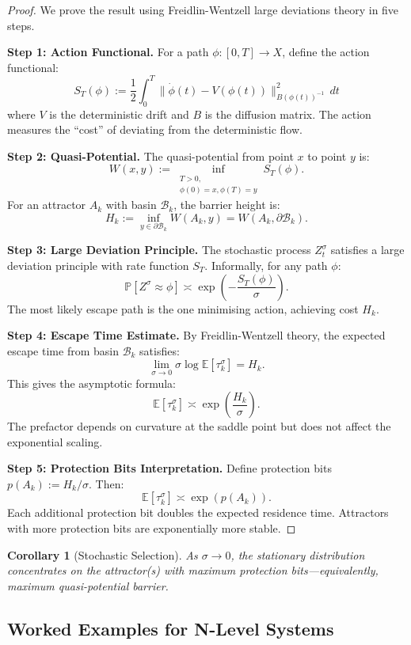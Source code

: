 \documentclass[12pt]{article}
\newtheorem{corollary}[theorem]{Corollary}
\newcommand{\E}{\mathbb{E}}
\begin{document}
\begin{proof}
We prove the result using Freidlin-Wentzell large deviations theory in five steps.

\textbf{Step 1: Action Functional.}
For a path $\phi: [0, T] \to X$, define the action functional:
\[
S_T(\phi) := \frac{1}{2} \int_0^T \|\dot{\phi}(t) - V(\phi(t))\|_{B(\phi(t))^{-1}}^2 \, dt
\]
where $V$ is the deterministic drift and $B$ is the diffusion matrix. The action measures the ``cost'' of deviating from the deterministic flow.

\textbf{Step 2: Quasi-Potential.}
The quasi-potential from point $x$ to point $y$ is:
\[
W(x, y) := \inf_{\substack{T > 0, \\ \phi(0) = x, \phi(T) = y}} S_T(\phi).
\]
For an attractor $A_k$ with basin $\mathcal{B}_k$, the barrier height is:
\[
H_k := \inf_{y \in \partial \mathcal{B}_k} W(A_k, y) = W(A_k, \partial \mathcal{B}_k).
\]

\textbf{Step 3: Large Deviation Principle.}
The stochastic process $Z_t^\sigma$ satisfies a large deviation principle with rate function $S_T$. Informally, for any path $\phi$:
\[
\mathbb{P}\left[ Z^\sigma \approx \phi \right] \asymp \exp\left( -\frac{S_T(\phi)}{\sigma} \right).
\]
The most likely escape path is the one minimising action, achieving cost $H_k$.

\textbf{Step 4: Escape Time Estimate.}
By Freidlin-Wentzell theory, the expected escape time from basin $\mathcal{B}_k$ satisfies:
\[
\lim_{\sigma \to 0} \sigma \log \E[\tau_k^\sigma] = H_k.
\]
This gives the asymptotic formula:
\[
\E[\tau_k^\sigma] \asymp \exp\left( \frac{H_k}{\sigma} \right).
\]
The prefactor depends on curvature at the saddle point but does not affect the exponential scaling.

\textbf{Step 5: Protection Bits Interpretation.}
Define protection bits $p(A_k) := H_k / \sigma$. Then:
\[
\E[\tau_k^\sigma] \asymp \exp(p(A_k)).
\]
Each additional protection bit doubles the expected residence time. Attractors with more protection bits are exponentially more stable.
\end{proof}

\begin{corollary}[Stochastic Selection]
As $\sigma \to 0$, the stationary distribution concentrates on the attractor(s) with maximum protection bits---equivalently, maximum quasi-potential barrier.
\end{corollary}

\subsection{Worked Examples for N-Level Systems}
\end{document}
